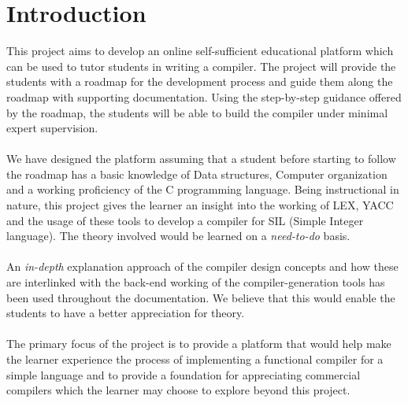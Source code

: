 \chapter{Introduction}

This project aims to develop an online self-sufficient educational platform which can be used to tutor students in writing a compiler. The project will provide the students with a roadmap for the development process and guide them along the roadmap with supporting documentation. Using the step-by-step guidance offered by the roadmap, the students will be able to build the compiler under minimal expert supervision.
\\
\\
We have designed the platform assuming that a student before starting to follow the roadmap has a basic knowledge of Data structures, Computer organization and a working proficiency of the C programming language. Being instructional in nature, this project gives the learner an insight into the working of LEX, YACC and the usage of these tools to develop a compiler for SIL (Simple Integer language). The theory involved would be learned on a \textit{need-to-do} basis.
\\
\\
An \textit{in-depth} explanation approach of the compiler design concepts and how these are interlinked with the back-end working of the compiler-generation tools has been used throughout the documentation. We believe that this would enable the students to have a better appreciation for theory.
\\
\\
The primary focus of the project is to provide a platform that would help make the learner experience the process of implementing a functional compiler for a simple language and to provide a foundation for appreciating commercial compilers which the learner may choose to explore beyond this project. 